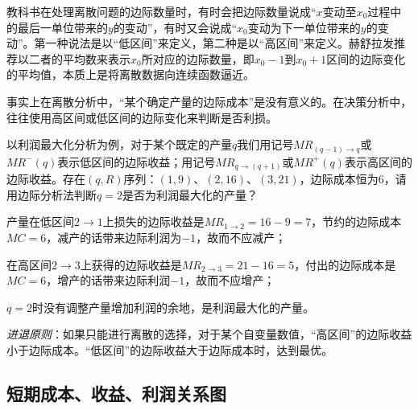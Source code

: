 教科书在处理离散问题的边际数量时，有时会把边际数量说成“$x$变动至$x_0$过程中的最后一单位带来的$y$的变动”，有时又会说成“$x_0$变动为下一单位带来的$y$的变动”。第一种说法是以“低区间”来定义，第二种是以“高区间”来定义。赫舒拉发推荐以二者的平均数来表示$x_0$所对应的边际数量，即$x_0 -1$到$x_0 +1$区间的边际变化的平均值，本质上是将离散数据向连续函数逼近。

事实上在离散分析中，“某个确定产量的边际成本”是没有意义的。在决策分析中，往往使用高区间或低区间的边际变化来判断是否利损。

以利润最大化分析为例，对于某个既定的产量$q$我们用记号$MR_{(q-1) \to q}$或$MR^{-}(q)$表示低区间的边际收益；用记号$MR_{q \to (q+1)}$或$MR^{+}(q)$表示高区间的边际收益。存在$(q,R)$序列：$(1,9)$、$(2,16)$、$(3,21)$，边际成本恒为6，请用边际分析法判断$q=2$是否为利润最大化的产量？
\begin{compactitem}
\item 产量在低区间$2 \to 1$上损失的边际收益是$MR_{1 \to 2}=16-9=7$，节约的边际成本$MC=6$，减产的话带来边际利润为$-1$，故而不应减产；
\item 在高区间$2 \to 3$上获得的边际收益是$MR_{2 \to 3}=21-16=5$，付出的边际成本是$MC=6$，增产的话带来边际利润$-1$，故而不应增产；
\item $q=2$时没有调整产量增加利润的余地，是利润最大化的产量。
\end{compactitem}

\emph{进退原则}：如果只能进行离散的选择，对于某个自变量数值，“高区间”的边际收益小于边际成本。“低区间”的边际收益大于边际成本时，达到最优。

\subsection*{短期成本、收益、利润关系图}
\label{sec:all-in-one-costs-relationship}

